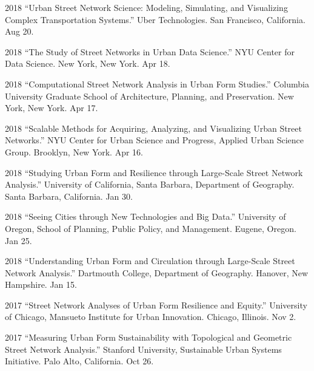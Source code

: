 \documentclass[12pt,letterpaper]{report}
\begin{document}
\begin{tablist}
        \item[2018] \tab \enquote{Urban Street Network Science: Modeling, Simulating, and Visualizing Complex Transportation Systems.} Uber Technologies. San Francisco, California. Aug 20.

        \item[2018] \tab \enquote{The Study of Street Networks in Urban Data Science.} NYU Center for Data Science. New York, New York. Apr 18.

        \item[2018] \tab \enquote{Computational Street Network Analysis in Urban Form Studies.} Columbia University Graduate School of Architecture, Planning, and Preservation. New York, New York. Apr 17.

        \item[2018] \tab \enquote{Scalable Methods for Acquiring, Analyzing, and Visualizing Urban Street Networks.} NYU Center for Urban Science and Progress, Applied Urban Science Group. Brooklyn, New York. Apr 16.

        \item[2018] \tab \enquote{Studying Urban Form and Resilience through Large-Scale Street Network Analysis.} University of California, Santa Barbara, Department of Geography. Santa Barbara, California. Jan 30.

        \item[2018] \tab \enquote{Seeing Cities through New Technologies and Big Data.} University of Oregon, School of Planning, Public Policy, and Management. Eugene, Oregon. Jan 25.


        \item[2018] \tab \enquote{Understanding Urban Form and Circulation through Large-Scale Street Network Analysis.} Dartmouth College, Department of Geography. Hanover, New Hampshire. Jan 15.

        \item[2017] \tab \enquote{Street Network Analyses of Urban Form Resilience and Equity.} University of Chicago, Mansueto Institute for Urban Innovation. Chicago, Illinois. Nov 2.

        \item[2017] \tab \enquote{Measuring Urban Form Sustainability with Topological and Geometric Street Network Analysis.} Stanford University, Sustainable Urban Systems Initiative. Palo Alto, California. Oct 26.


\end{tablist}
\end{document}
